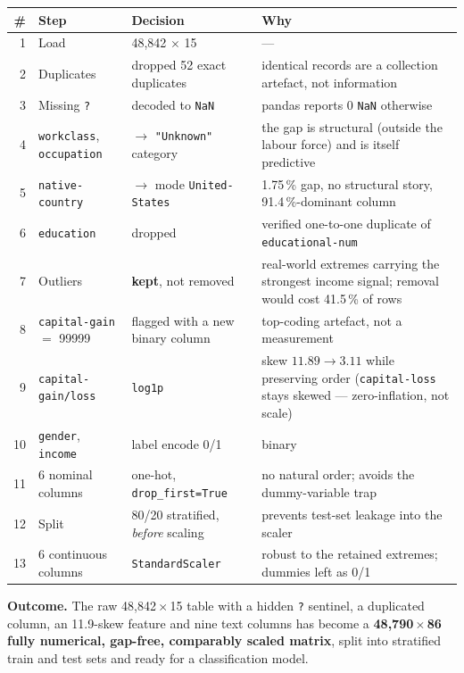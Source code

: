 \documentclass[11pt,a4paper]{article}
\newcommand{\code}[1]{\texttt{\small #1}}
\begin{document}
\begin{table}[H]
\centering
\small
\begin{adjustbox}{max width=\linewidth}
\begin{tabular}{rL{3.5cm}L{4.6cm}L{6.6cm}}
\toprule
\textbf{\#} & \textbf{Step} & \textbf{Decision} & \textbf{Why} \\
  & Load & 48{,}842 $\times$ 15 & --- \\
2  & Duplicates & dropped 52 exact duplicates & identical records are a collection
     artefact, not information \\
3  & Missing \code{?} & decoded to \code{NaN} & pandas reports 0 \code{NaN} otherwise \\
4  & \code{workclass}, \code{occupation} & $\to$ \code{"Unknown"} category & the gap is
     structural (outside the labour force) and is itself predictive \\
5  & \code{native-country} & $\to$ mode \code{United-States} & 1.75\,\% gap, no structural
     story, 91.4\,\%-dominant column \\
6  & \code{education} & dropped & verified one-to-one duplicate of
     \code{educational-num} \\
7  & Outliers & \textbf{kept}, not removed & real-world extremes carrying the strongest
     income signal; removal would cost 41.5\,\% of rows \\
8  & \code{capital-gain} $=$ 99999 & flagged with a new binary column & top-coding
     artefact, not a measurement \\
9  & \code{capital-gain/loss} & \code{log1p} & skew $11.89\to3.11$ while preserving order
     (\code{capital-loss} stays skewed --- zero-inflation, not scale) \\
10 & \code{gender}, \code{income} & label encode 0/1 & binary \\
11 & 6 nominal columns & one-hot, \mbox{\code{drop\_first=True}} & no natural order; avoids the
     dummy-variable trap \\
12 & Split & 80/20 stratified, \emph{before} scaling & prevents test-set leakage into the
     scaler \\
13 & 6 continuous columns & \code{StandardScaler} & robust to the retained extremes;
     dummies left as 0/1 \\
\bottomrule
\end{tabular}
\end{adjustbox}
\end{table}

\noindent
\textbf{Outcome.} The raw 48{,}842\,$\times$\,15 table with a hidden \code{?} sentinel, a
duplicated column, an 11.9-skew feature and nine text columns has become a
\textbf{48{,}790\,$\times$\,86 fully numerical, gap-free, comparably scaled matrix}, split
into stratified train and test sets and ready for a classification model.
\end{document}
